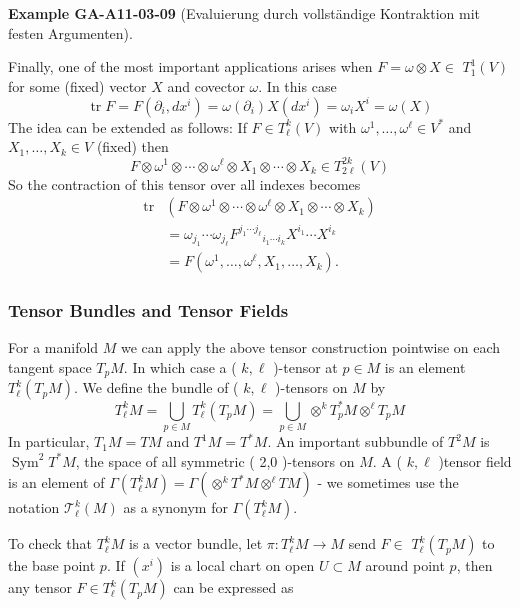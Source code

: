 \documentclass[10pt, letterpaper]{article}
\newcommand{\CustomHeading}[3]{%
  \par\medskip\noindent%
  \textbf{#1 #2} \textnormal{(#3)}.\enskip%
}
\newenvironment{EXA}[2]{\begin{unitbox}\CustomHeading{Example}{#1}{#2}}{\end{unitbox}}
\begin{document}
\begin{EXA}{GA-A11-03-09}{Evaluierung durch vollständige Kontraktion mit festen Argumenten}
Finally, one of the most important applications arises when $F=\omega \otimes X \in$ $T_{1}^{1}(V)$ for some (fixed) vector $X$ and covector $\omega$. In this case
$$
\operatorname{tr} F=F\left(\partial_{i}, d x^{i}\right)=\omega\left(\partial_{i}\right) X\left(d x^{i}\right)=\omega_{i} X^{i}=\omega(X)
$$
The idea can be extended as follows: If $F \in T_{\ell}^{k}(V)$ with $\omega^{1}, \ldots, \omega^{\ell} \in V^{*}$ and $X_{1}, \ldots, X_{k} \in V$ (fixed) then
$$
F \otimes \omega^{1} \otimes \cdots \otimes \omega^{\ell} \otimes X_{1} \otimes \cdots \otimes X_{k} \in T_{2 \ell}^{2 k}(V)
$$
So the contraction of this tensor over all indexes becomes
$$
\begin{aligned}
\operatorname{tr} & \left(F \otimes \omega^{1} \otimes \cdots \otimes \omega^{\ell} \otimes X_{1} \otimes \cdots \otimes X_{k}\right) \\
& =\omega_{j_{1}} \cdots \omega_{j_{\ell}} F^{j_{1} \cdots j_{\ell}}{ }_{i_{1} \cdots i_{k}} X^{i_{1}} \cdots X^{i_{k}} \\
& =F\left(\omega^{1}, \ldots, \omega^{\ell}, X_{1}, \ldots, X_{k}\right) .
\end{aligned}
$$
\end{EXA}




\subsubsection*{Tensor Bundles and Tensor Fields}


For a manifold $M$ we can apply the above tensor construction pointwise on each tangent space $T_{p} M$. In which case a ( $k, \ell$ )-tensor at $p \in M$ is an element $T_{\ell}^{k}\left(T_{p} M\right)$. We define the bundle of ( $k, \ell$ )-tensors on $M$ by
$$
T_{\ell}^{k} M=\bigcup_{p \in M} T_{\ell}^{k}\left(T_{p} M\right)=\bigcup_{p \in M} \otimes^{k} T_{p}^{*} M \otimes^{\ell} T_{p} M
$$
In particular, $T_{1} M=T M$ and $T^{1} M=T^{*} M$. An important subbundle of $T^{2} M$ is $\operatorname{Sym}^{2} T^{*} M$, the space of all symmetric ( 2,0 )-tensors on $M$. A ( $k, \ell$ )tensor field is an element of $\Gamma\left(T_{\ell}^{k} M\right)=\Gamma\left(\otimes^{k} T^{*} M \otimes^{\ell} T M\right)$ - we sometimes use the notation $\mathscr{T}_{\ell}^{k}(M)$ as a synonym for $\Gamma\left(T_{\ell}^{k} M\right)$.

To check that $T_{\ell}^{k} M$ is a vector bundle, let $\pi: T_{\ell}^{k} M \rightarrow M$ send $F \in$ $T_{\ell}^{k}\left(T_{p} M\right)$ to the base point $p$. If $\left(x^{i}\right)$ is a local chart on open $U \subset M$ around point $p$, then any tensor $F \in T_{\ell}^{k}\left(T_{p} M\right)$ can be expressed as
\end{document}
